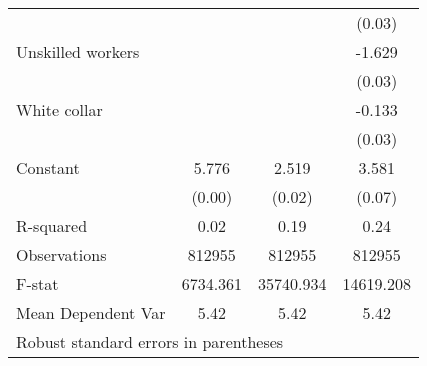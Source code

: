{\begin{tabular}{l*{3}{c}}
                    &                     &                     &      (0.03)         \\
Unskilled workers   &                     &                     &      -1.629\sym{***}\\
                    &                     &                     &      (0.03)         \\
White collar        &                     &                     &      -0.133\sym{***}\\
                    &                     &                     &      (0.03)         \\
Constant            &       5.776\sym{***}&       2.519\sym{***}&       3.581\sym{***}\\
                    &      (0.00)         &      (0.02)         &      (0.07)         \\
\hline
R-squared           &        0.02         &        0.19         &        0.24         \\
Observations        &      812955         &      812955         &      812955         \\
F-stat              &    6734.361         &   35740.934         &   14619.208         \\
Mean Dependent Var  &        5.42         &        5.42         &        5.42         \\
\hline\hline
\multicolumn{4}{l}{\footnotesize Robust standard errors in parentheses}\\
\end{tabular}
}

